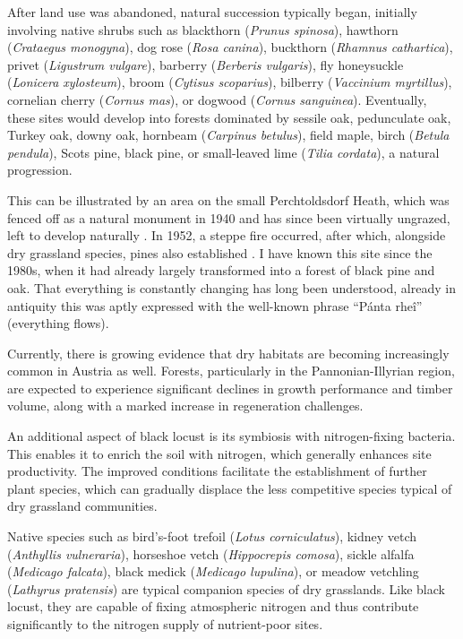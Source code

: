 After land use was abandoned, natural succession typically began, initially involving native shrubs such as blackthorn (\emph{Prunus spinosa}), hawthorn (\emph{Crataegus monogyna}), dog rose (\emph{Rosa canina}), buckthorn (\emph{Rhamnus cathartica}), privet (\emph{Ligustrum vulgare}), barberry (\emph{Berberis vulgaris}), fly honeysuckle (\emph{Lonicera xylosteum}), broom (\emph{Cytisus scoparius}), bilberry (\emph{Vaccinium myrtillus}), cornelian cherry (\emph{Cornus mas}), or dogwood (\emph{Cornus sanguinea}). Eventually, these sites would develop into forests dominated by sessile oak, pedunculate oak, Turkey oak, downy oak, hornbeam (\emph{Carpinus betulus}), field maple, birch (\emph{Betula pendula}), Scots pine, black pine, or small-leaved lime (\emph{Tilia cordata}), a natural progression.

This can be illustrated by an area on the small Perchtoldsdorf Heath, which was fenced off as a natural monument in 1940 and has since been virtually ungrazed, left to develop naturally \citep{rosenkranz1953heide}. In 1952, a steppe fire occurred, after which, alongside dry grassland species, pines also established \citep{rosenkranz1953heideBrand}. I have known this site since the 1980s, when it had already largely transformed into a forest of black pine and oak. That everything is constantly changing has long been understood, already in antiquity this was aptly expressed with the well-known phrase \enquote{Pánta rheî} (everything flows). 

Currently, there is growing evidence that dry habitats are becoming increasingly common in Austria as well. Forests, particularly in the Pannonian-Illyrian region, are expected to experience significant declines in growth performance and timber volume, along with a marked increase in regeneration challenges.


An additional aspect of black locust is its symbiosis with nitrogen-fixing bacteria. This enables it to enrich the soil with nitrogen, which generally enhances site productivity. The improved conditions facilitate the establishment of further plant species, which can gradually displace the less competitive species typical of dry grassland communities.

Native species such as bird's-foot trefoil (\emph{Lotus corniculatus}), kidney vetch (\emph{Anthyllis vulneraria}), horseshoe vetch (\emph{Hippocrepis comosa}), sickle alfalfa (\emph{Medicago falcata}), black medick (\emph{Medicago lupulina}), or meadow vetchling (\emph{Lathyrus pratensis}) are typical companion species of dry grasslands. Like black locust, they are capable of fixing atmospheric nitrogen and thus contribute significantly to the nitrogen supply of nutrient-poor sites.

